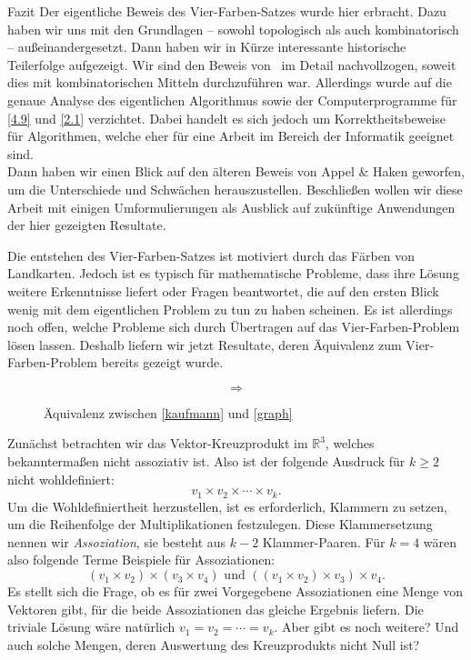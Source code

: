 \begin{chapter}{Fazit}
 Der eigentliche Beweis des Vier-Farben-Satzes wurde hier erbracht. Dazu haben wir uns mit den Grundlagen -- sowohl topologisch als auch kombinatorisch -- außeinandergesetzt. Dann haben wir in Kürze interessante historische Teilerfolge aufgezeigt. Wir sind den Beweis von \rsst\-\  im Detail nachvollzogen, soweit dies mit kombinatorischen Mitteln durchzuführen war. Allerdings wurde auf die genaue Analyse des eigentlichen Algorithmus sowie der Computerprogramme für \ref{4.9} und \ref{2.1} verzichtet. Dabei handelt es sich jedoch um Korrektheitsbeweise für Algorithmen, welche eher für eine Arbeit im Bereich der Informatik geeignet sind.\\
 Dann haben wir einen Blick auf den älteren Beweis von Appel \& Haken geworfen, um die Unterschiede und Schwächen herauszustellen. Beschließen wollen wir diese Arbeit mit einigen Umformulierungen als Ausblick auf zukünftige Anwendungen der hier gezeigten Resultate.

 Die entstehen des Vier-Farben-Satzes ist motiviert durch das Färben von Landkarten. Jedoch ist es typisch für mathematische Probleme, dass ihre Lösung weitere Erkenntnisse liefert oder Fragen beantwortet, die auf den ersten Blick wenig mit dem eigentlichen Problem zu tun zu haben scheinen. Es ist allerdings noch offen, welche Probleme sich durch Übertragen auf das Vier-Farben-Problem lösen lassen. Deshalb liefern wir jetzt Resultate, deren Äquivalenz zum Vier-Farben-Problem bereits gezeigt wurde.
 
 \begin{figure}[hb]
  \label{kaufmannaequiv}
  \[  \Rightarrow  \]
  \caption[Äquivalenz zwischen \ref{kaufmann} und \ref{graph}]{Äquivalenz zwischen \ref{kaufmann} und \ref{graph}}
 \end{figure}

 Zunächst betrachten wir das Vektor-Kreuzprodukt im $\mathbb{R}^3$, welches bekanntermaßen nicht assoziativ ist. Also ist der folgende Ausdruck für $k \geq 2$ nicht wohldefiniert:
 \[ v_1 \times v_2 \times \cdots \times v_k \text{.}\]
 Um die Wohldefiniertheit herzustellen, ist es erforderlich, Klammern zu setzen, um die Reihenfolge der Multiplikationen festzulegen. Diese Klammersetzung nennen wir \textit{Assoziation}, sie besteht aus $k-2$ Klammer-Paaren. Für $k=4$ wären also folgende Terme Beispiele für Assoziationen:
 \[ (v_1 \times v_2) \times (v_3 \times v_4) \text{ und } ((v_1 \times v_2) \times v_3) \times v_4 \text{.}\]
 Es stellt sich die Frage, ob es für zwei Vorgegebene Assoziationen eine Menge von Vektoren gibt, für die beide Assoziationen das gleiche Ergebnis liefern. Die triviale Lösung wäre natürlich $v_1 = v_2 = \cdots = v_k$. Aber gibt es noch weitere? Und auch solche Mengen, deren Auswertung des Kreuzprodukts nicht Null ist?
 

\end{chapter}
